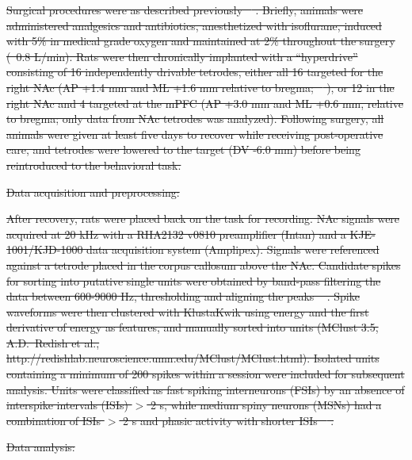 \documentclass[11pt]{article}
\let\cite=\citep
\let\citeNP=\citealt
\providecommand{\DIFdel}[1]{{\protect\color{red}\sout{#1}}}                      %
\begin{document}
\DIFdel{Surgical procedures were as described previously
\mbox{%
\cite{Malhotra2015}}\hspace{0pt}%
. Briefly, animals were administered analgesics and
antibiotics, anesthetized with isoflurane, induced with 5\% in medical
grade oxygen and maintained at 2\% throughout the surgery (~0.8
L/min). Rats were then chronically implanted with a ``hyperdrive''
consisting of 16 independently drivable tetrodes, either all 16
targeted for the right NAc (AP +1.4 mm and ML +1.6 mm relative to
bregma; \mbox{%
\citeNP{atlas}}\hspace{0pt}%
), or 12 in the right NAc and 4 targeted at the
mPFC (AP +3.0 mm and ML +0.6 mm, relative to bregma; only data from
NAc tetrodes was analyzed). Following surgery, all animals were given
at least five days to recover while receiving post-operative care, and
tetrodes were lowered to the target (DV -6.0 mm) before being
reintroduced to the behavioral task.
}%

\DIFdel{Data acquisition and preprocessing:}%

\DIFdel{After recovery, rats were placed back on the task for recording. NAc
signals were acquired at 20 kHz with a RHA2132 v0810 preamplifier
(Intan) and a KJE-1001/KJD-1000 data acquisition system
(Amplipex). Signals were referenced against a tetrode placed in the
corpus callosum above the NAc. Candidate spikes for sorting into
putative single units were obtained by band-pass filtering the data
between 600-9000 Hz, thresholding and aligning the peaks \mbox{%
\cite[UltraMegaSort2k, ][]{Hill2011}}\hspace{0pt}%
. Spike waveforms were then
clustered with KlustaKwik using energy and the first derivative of
energy as features, and manually sorted into units (MClust 3.5,
A.D.\ Redish et al., http://redishlab.neuroscience.umn.edu/MClust/MClust.html). Isolated units containing a minimum of 200
spikes within a session were included for subsequent analysis. Units
were classified as fast spiking interneurons (FSIs) by an absence of
interspike intervals (ISIs) $>$ 2 s, while medium spiny neurons (MSNs)
had a combination of ISIs $>$ 2 s and phasic activity with shorter
ISIs \mbox{%
\cite{Atallah2014,Barnes2005}}\hspace{0pt}%
.
}%

\DIFdel{Data analysis:}%
\end{document}
